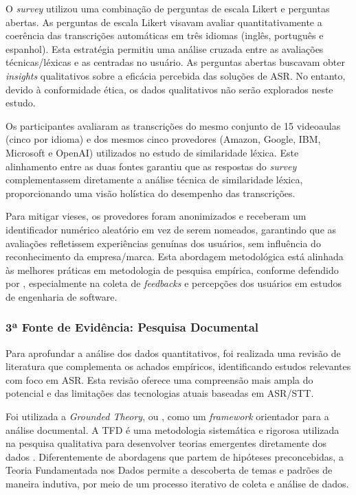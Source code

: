 O \textit{survey} utilizou uma combinação de perguntas de escala Likert e perguntas abertas. As perguntas de escala Likert visavam avaliar quantitativamente a coerência das transcrições automáticas em três idiomas (inglês, português e espanhol). Esta estratégia permitiu uma análise cruzada entre as avaliações técnicas/léxicas e as centradas no usuário. As perguntas abertas buscavam obter \textit{insights} qualitativos sobre a eficácia percebida das soluções de ASR. No entanto, devido à conformidade ética, os dados qualitativos não serão explorados neste estudo.

Os participantes avaliaram as transcrições do mesmo conjunto de 15 videoaulas (cinco por idioma) e dos mesmos cinco provedores (Amazon, Google, IBM, Microsoft e OpenAI) utilizados no estudo de similaridade léxica. Este alinhamento entre as duas fontes garantiu que as respostas do \textit{survey} complementassem diretamente a análise técnica de similaridade léxica, proporcionando uma visão holística do desempenho das transcrições.

Para mitigar vieses, os provedores foram anonimizados e receberam um identificador numérico aleatório em vez de serem nomeados, garantindo que as avaliações refletissem experiências genuínas dos usuários, sem influência do reconhecimento da empresa/marca. Esta abordagem metodológica está alinhada às melhores práticas em metodologia de pesquisa empírica, conforme defendido por \cite{Sommerville2015}, especialmente na coleta de \textit{feedbacks} e percepções dos usuários em estudos de engenharia de software.

\subsubsection{3ª Fonte de Evidência: Pesquisa Documental}

Para aprofundar a análise dos dados quantitativos, foi realizada uma revisão de literatura que complementa os achados empíricos, identificando estudos relevantes com foco em ASR. Esta revisão oferece uma compreensão mais ampla do potencial e das limitações das tecnologias atuais baseadas em ASR/STT.

Foi utilizada a \textit{Grounded Theory}, ou , como um \textit{framework} orientador para a análise documental. A TFD é uma metodologia sistemática e rigorosa utilizada na pesquisa qualitativa para desenvolver teorias emergentes diretamente dos dados \cite{Charmaz2009}. Diferentemente de abordagens que partem de hipóteses preconcebidas, a Teoria Fundamentada nos Dados permite a descoberta de temas e padrões de maneira indutiva, por meio de um processo iterativo de coleta e análise de dados.


